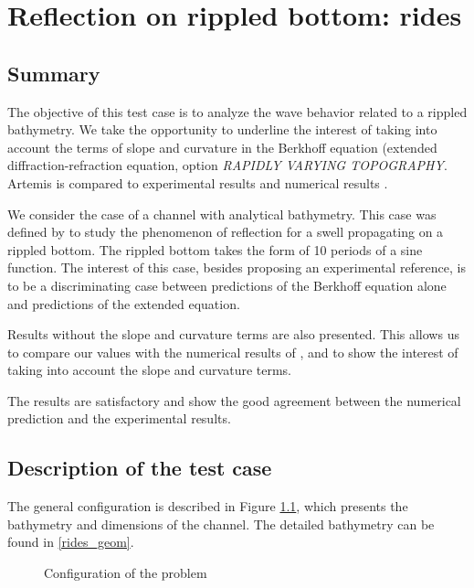 \chapter{Reflection on rippled bottom: rides}

\section{Summary}

The objective of this test case is to analyze the wave behavior related to a
rippled bathymetry. We take the opportunity to underline the interest of
taking into account the terms of slope and curvature in the Berkhoff equation
(extended diffraction-refraction equation, option {\it RAPIDLY VARYING
 TOPOGRAPHY}. Artemis is compared to experimental results \cite{davies1984}
and numerical results \cite{Michel1999}.

We consider the case of a channel with analytical bathymetry. This case was
defined by \cite{davies1984} to study the phenomenon of reflection for a swell
propagating on a rippled bottom. The rippled bottom takes the form of 10
periods of a sine function. The interest of this case, besides proposing an
experimental reference, is to be a discriminating case between predictions of
the Berkhoff equation alone and predictions of the extended equation.

Results without the slope and curvature terms are also presented. This
allows us to compare our values with the numerical results of
\cite{Michel1999}, and to show the interest of taking into account the slope
and curvature terms.

The results are satisfactory and show the good agreement between the numerical
prediction and the experimental results.


\section{Description of the test case}

The general configuration is described in Figure \ref{fig:rides_config}, which
presents the bathymetry and dimensions of the channel. The detailed bathymetry
can be found in \ref{rides_geom}.

\begin{figure}[h]
\begin{center}
\end{center}
\caption{Configuration of the problem}
\label{fig:rides_config}
\end{figure}


